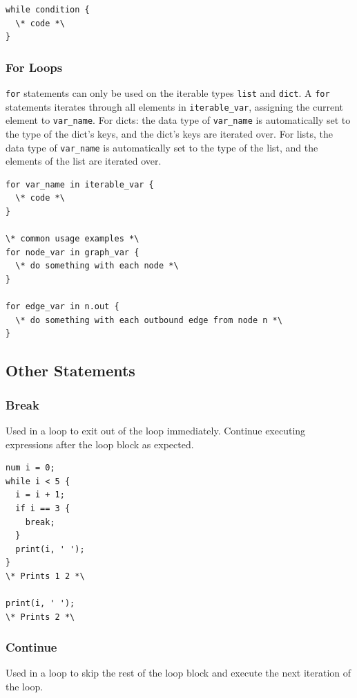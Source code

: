 \documentclass{article}
\newcommand{\code}[1]{\texttt{#1}} %
\begin{document}
\begin{lstlisting}[language=pltLang, label=lst:while-loop]
while condition {
  \* code *\
}

\end{lstlisting}

\subsubsection{For Loops}
\code{for} statements can only be used on the iterable types \code{list} and \code{dict}. A \code{for} statements iterates through all elements in \code{iterable\_var}, assigning the current element to \code{var\_name}. For dicts: the data type of \code{var\_name} is automatically set to the type of the dict's keys, and the dict's keys are iterated over. For lists, the data type of \code{var\_name} is automatically set to the type of the list, and the elements of the list are iterated over. 

\begin{lstlisting}[language=pltLang, label=lst:for-loop]
for var_name in iterable_var {
  \* code *\
}

\* common usage examples *\
for node_var in graph_var {
  \* do something with each node *\
}

for edge_var in n.out {
  \* do something with each outbound edge from node n *\
}

\end{lstlisting}

\subsection{Other Statements}

\subsubsection{Break}
Used in a loop to exit out of the loop immediately. Continue executing expressions after the loop block as expected.

\begin{lstlisting}[language=pltlang, label=lst:break-statement]
num i = 0;
while i < 5 {
  i = i + 1;
  if i == 3 {
    break;
  }
  print(i, ' ');
}
\* Prints 1 2 *\

print(i, ' ');
\* Prints 2 *\

\end{lstlisting}

\subsubsection{Continue}
Used in a loop to skip the rest of the loop block and execute the next iteration of the loop.
\end{document}
